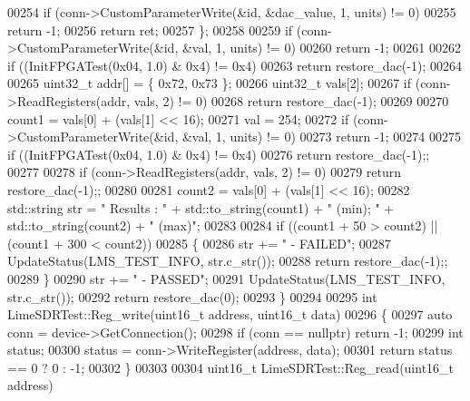 \begin{DoxyCode}
{{{00254         \textcolor{keywordflow}{if} (conn->CustomParameterWrite(&\textcolor{keywordtype}{id}, &dac\_value, 1, units) != 0)
00255             \textcolor{keywordflow}{return} -1;
00256         \textcolor{keywordflow}{return} ret;
00257     \};
00258 
00259     \textcolor{keywordflow}{if} (conn->CustomParameterWrite(&\textcolor{keywordtype}{id}, &val, 1, units) != 0)
00260         \textcolor{keywordflow}{return} -1;
00261 
00262     \textcolor{keywordflow}{if} ((InitFPGATest(0x04, 1.0) & 0x4) != 0x4)
00263         \textcolor{keywordflow}{return} restore\_dac(-1);
00264 
00265     uint32\_t addr[] = \{ 0x72, 0x73 \};
00266     uint32\_t vals[2];
00267     \textcolor{keywordflow}{if} (conn->ReadRegisters(addr, vals, 2) != 0)
00268         \textcolor{keywordflow}{return} restore\_dac(-1);
00269 
00270     count1 = vals[0] + (vals[1] << 16);
00271     val = 254;
00272     \textcolor{keywordflow}{if} (conn->CustomParameterWrite(&\textcolor{keywordtype}{id}, &val, 1, units) != 0)
00273         \textcolor{keywordflow}{return} -1;
00274 
00275     \textcolor{keywordflow}{if} ((InitFPGATest(0x04, 1.0) & 0x4) != 0x4)
00276         \textcolor{keywordflow}{return} restore\_dac(-1);;
00277 
00278     \textcolor{keywordflow}{if} (conn->ReadRegisters(addr, vals, 2) != 0)
00279         \textcolor{keywordflow}{return} restore\_dac(-1);;
00280 
00281     count2 = vals[0] + (vals[1] << 16);
00282     std::string str = \textcolor{stringliteral}{"  Results : "} + std::to\_string(count1) + \textcolor{stringliteral}{" (min); "} + std::to\_string(count2) + \textcolor{stringliteral}{"
       (max)"};
00283 
00284     \textcolor{keywordflow}{if} ((count1 + 50 > count2) || (count1 + 300 < count2))
00285     \{
00286         str += \textcolor{stringliteral}{" - FAILED"};
00287         UpdateStatus(LMS_TEST_INFO, str.c\_str());
00288         \textcolor{keywordflow}{return} restore\_dac(-1);;
00289     \}
00290     str += \textcolor{stringliteral}{" - PASSED"};
00291     UpdateStatus(LMS_TEST_INFO, str.c\_str());
00292     \textcolor{keywordflow}{return} restore\_dac(0);
00293 \}
00294 
00295 \textcolor{keywordtype}{int} LimeSDRTest::Reg_write(uint16\_t address, uint16\_t data)
00296 \{
00297     \textcolor{keyword}{auto} conn = device->GetConnection();
00298     \textcolor{keywordflow}{if} (conn == \textcolor{keyword}{nullptr}) \textcolor{keywordflow}{return} -1;
00299     \textcolor{keywordtype}{int} status;
00300     status = conn->WriteRegister(address, data);
00301     \textcolor{keywordflow}{return} status == 0 ? 0 : -1;
00302 \}
00303 
00304 uint16\_t LimeSDRTest::Reg_read(uint16\_t address)
}}}
\end{DoxyCode}
